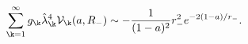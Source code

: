 \begin{equation*}
     \sum_{\k=1}^\infty
    g_\k \hat \lambda_\k^4  {\cal V}_\k(a,R_-)
    \sim
    -{1\over (1-a)^2}{r_-^2}
    e^{-2(1-a)/r_-}.
\end{equation*}

